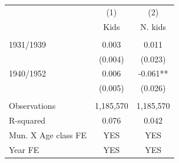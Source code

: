 \begin{tabular}{lcc} \hline
 & (1) & (2) \\
 & Kids & N. kids \\ \hline
 &  &  \\
1931/1939 & 0.003 & 0.011 \\
 & (0.004) & (0.023) \\
1940/1952 & 0.006 & -0.061** \\
 & (0.005) & (0.026) \\
 &  &  \\
Observations & 1,185,570 & 1,185,570 \\
R-squared & 0.076 & 0.042 \\
Mun. X Age class FE & YES & YES \\
 Year FE & YES & YES \\ \hline
\end{tabular}
